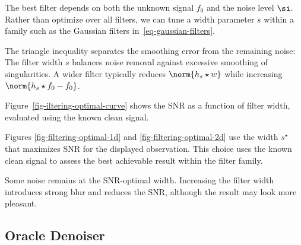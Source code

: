 The best filter depends on both the unknown signal $f_0$ and the noise level $\si$. Rather than optimize over all filters, we can tune a width parameter $s$ within a family such as the Gaussian filters in~\eqref{eq-gaussian-filters}.

The triangle inequality separates the smoothing error from the remaining noise:
The filter width $s$ balances noise removal against excessive smoothing of singularities. A wider filter typically reduces $\norm{h_s \star w}$ while increasing $\norm{h_s\star f_0-f_0}$.

Figure~\ref{fig-iltering-optimal-curve} shows the SNR as a function of filter width, evaluated using the known clean signal.


Figures \ref{fig-filtering-optimal-1d} and \ref{fig-filtering-optimal-2d} use the width $s^\star$ that maximizes SNR for the displayed observation. This choice uses the known clean signal to assess the best achievable result within the filter family.



Some noise remains at the SNR-optimal width. Increasing the filter width introduces strong blur and reduces the SNR, although the result may look more pleasant.


\subsection{Oracle Denoiser}

